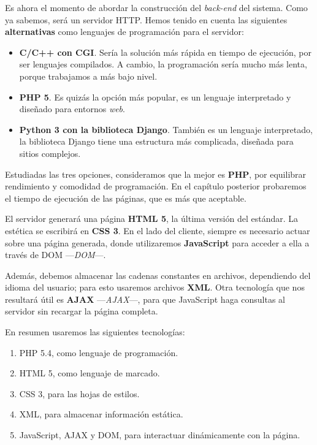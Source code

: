 Es ahora el momento de abordar la construcción del \textit{back-end} del sistema. Como ya sabemos, será un servidor \acrshort{HTTP}. Hemos tenido en cuenta las siguientes \textbf{alternativas} como lenguajes de programación para el servidor:

\begin{itemize}
	\item \textbf{C/C++ con \acrshort{CGI}}. Sería la solución más rápida en tiempo de ejecución, por ser lenguajes compilados. A cambio, la programación sería mucho más lenta, porque trabajamos a más bajo nivel.
	
	\item \textbf{PHP 5}. Es quizás la opción más popular, es un lenguaje interpretado y diseñado para entornos \textit{web}.
	
	\item \textbf{Python 3 con la biblioteca Django}. También es un lenguaje interpretado, la biblioteca Django tiene una estructura más complicada, diseñada para sitios complejos.
\end{itemize}

Estudiadas las tres opciones, consideramos que la mejor es \textbf{PHP}, por equilibrar rendimiento y comodidad de programación. En el capítulo posterior probaremos el tiempo de ejecución de las páginas, que es más que aceptable.

El servidor generará una página \textbf{\acrshort{HTML} 5}, la última versión del estándar. La estética se escribirá en \textbf{\acrshort{CSS} 3}. En el lado del cliente, siempre es necesario actuar sobre una página generada, donde utilizaremos \textbf{JavaScript} para acceder a ella a través de \acrshort{DOM} ---\textit{\acrlong{DOM}}---.

Además, debemos almacenar las cadenas constantes en archivos, dependiendo del idioma del usuario; para esto usaremos archivos \textbf{\acrshort{XML}}. Otra tecnología que nos resultará útil es \textbf{\acrshort{AJAX}} ---\textit{\acrlong{AJAX}}---, para que JavaScript haga consultas al servidor sin recargar la página completa.

En resumen usaremos las siguientes tecnologías:

\begin{enumerate}
	\item PHP 5.4, como lenguaje de programación.
	\item \acrshort{HTML} 5, como lenguaje de marcado.
	\item \acrshort{CSS} 3, para las hojas de estilos.
	\item \acrshort{XML}, para almacenar información estática.
	\item JavaScript, \acrshort{AJAX} y \acrshort{DOM}, para interactuar dinámicamente con la página.
\end{enumerate}

